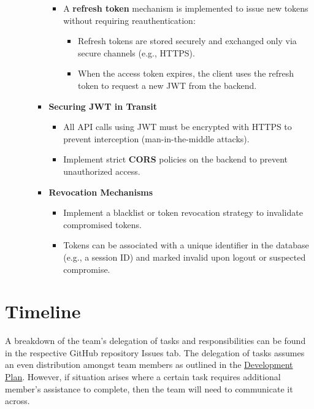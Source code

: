 \documentclass[12pt, titlepage]{article}
\begin{document}
\begin{enumerate}
\begin{itemize}
\begin{itemize}
\begin{itemize}
				\item A \textbf{refresh token} mechanism is implemented to issue new tokens without requiring reauthentication:
				\begin{itemize}
					\item Refresh tokens are stored securely and exchanged only via secure channels (e.g., HTTPS).
					\item When the access token expires, the client uses the refresh token to request a new JWT from the backend.
				\end{itemize}
			\end{itemize}
			\item \textbf{Securing JWT in Transit}
			\begin{itemize}
				\item All API calls using JWT must be encrypted with HTTPS to prevent interception (man-in-the-middle attacks).
				\item Implement strict \textbf{CORS} policies on the backend to prevent unauthorized access.
			\end{itemize}
			\item \textbf{Revocation Mechanisms}
			\begin{itemize}
				\item Implement a blacklist or token revocation strategy to invalidate compromised tokens.
				\item Tokens can be associated with a unique identifier in the database (e.g., a session ID) and marked invalid upon logout or suspected compromise.
			\end{itemize}
		\end{itemize}
	\end{itemize}
\end{enumerate}

\section{Timeline}

A breakdown of the team's delegation of tasks and responsibilities can be found in the respective GitHub repository Issues tab. The
delegation of tasks assumes an even distribution amongst team members as outlined in the \href{https://github.com/PlutosCapstone/Plutos/blob/main/docs/DevelopmentPlan/DevelopmentPlan.pdf}{Development Plan}. However, if situation arises
where a certain task requires additional member's assistance to complete, then the team will need to communicate it across. \\
\end{document}
